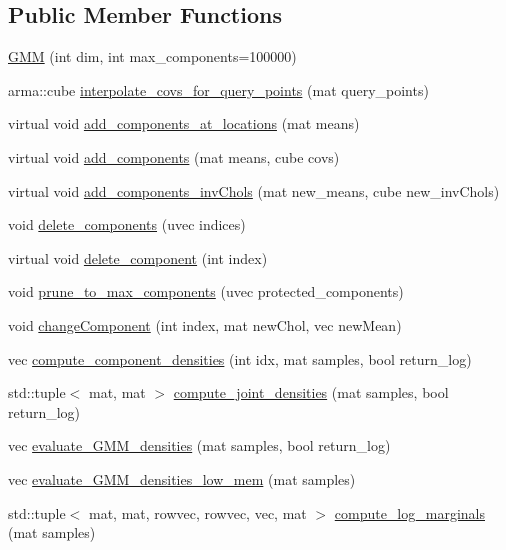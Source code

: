 \subsection*{Public Member Functions}
\begin{DoxyCompactItemize}
\item 
\hyperlink{classGMM_a84d95fb2c6582568a9d9a1b0efe200a4}{G\+MM} (int dim, int max\+\_\+components=100000)
\item 
arma\+::cube \hyperlink{classGMM_acd0dd8e7f38a792f515d296dd467924a}{interpolate\+\_\+covs\+\_\+for\+\_\+query\+\_\+points} (mat query\+\_\+points)
\item 
virtual void \hyperlink{classGMM_a00680c4a0c5f3befd742015bb8ad0a08}{add\+\_\+components\+\_\+at\+\_\+locations} (mat means)
\item 
virtual void \hyperlink{classGMM_ae33b6f52e8585c0cd590fd1d509956b0}{add\+\_\+components} (mat means, cube covs)
\item 
virtual void \hyperlink{classGMM_a07d7ade16c34458f6cf8fad958728c98}{add\+\_\+components\+\_\+inv\+Chols} (mat new\+\_\+means, cube new\+\_\+inv\+Chols)
\item 
void \hyperlink{classGMM_a82a84a6ad3ca8f5943b2ecaece9b6d1c}{delete\+\_\+components} (uvec indices)
\item 
virtual void \hyperlink{classGMM_a25c1ccd0c99b1ebd1e36592b912e74c2}{delete\+\_\+component} (int index)
\item 
void \hyperlink{classGMM_a929918e74c549b6ccca8c3cc246cd809}{prune\+\_\+to\+\_\+max\+\_\+components} (uvec protected\+\_\+components)
\item 
void \hyperlink{classGMM_a95ec14bd0e19af434ecb7b892288c6de}{change\+Component} (int index, mat new\+Chol, vec new\+Mean)
\item 
vec \hyperlink{classGMM_abcf7aa873a9bc0df374ff1284de786bc}{compute\+\_\+component\+\_\+densities} (int idx, mat samples, bool return\+\_\+log)
\item 
std\+::tuple$<$ mat, mat $>$ \hyperlink{classGMM_a8a9e502395f9d7f6a63eb7f56df5a73f}{compute\+\_\+joint\+\_\+densities} (mat samples, bool return\+\_\+log)
\item 
vec \hyperlink{classGMM_a1c2d04636a640ce56bf245df750e97ea}{evaluate\+\_\+\+G\+M\+M\+\_\+densities} (mat samples, bool return\+\_\+log)
\item 
vec \hyperlink{classGMM_a9a0e20b34d77c21fb31449dac5d1bd32}{evaluate\+\_\+\+G\+M\+M\+\_\+densities\+\_\+low\+\_\+mem} (mat samples)
\item 
std\+::tuple$<$ mat, mat, rowvec, rowvec, vec, mat $>$ \hyperlink{classGMM_a11d50f8336e3f0b4371fa4c7c023e11f}{compute\+\_\+log\+\_\+marginals} (mat samples)

\end{DoxyCompactItemize}
